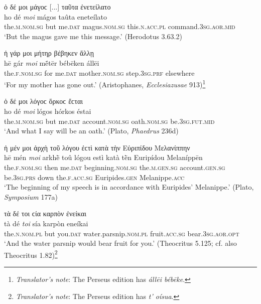 \begin{exe}
\ex ὁ δέ μοι μάγοϲ {[}...{]} ταῦτα ἐνετείλατο\\
\gll ho dé \emph{moi} mágos taûta eneteílato\\
the.\textsc{m.nom.sg} but me.\textsc{dat} magus.\textsc{nom.sg}
this.\textsc{n.acc.pl} command.\textsc{3sg.aor.mid}\\
\trans `But the magus gave me this message.' (Herodotus 3.63.2)
\label{artpron7}
\end{exe}

\begin{exe}
\ex ἡ γάρ μοι μήτηρ βέβηκεν ἄλλῃ\\
\gll hē gár \emph{moi} mḗtēr bébēken állēi\\
the.\textsc{f.nom.sg} for me.\textsc{dat} mother.\textsc{nom.sg}
step.\textsc{3sg.prf} elsewhere\\
\trans `For my mother has gone out.' (Aristophanes, \textit{Ecclesiazusae} 913)\footnote{\emph{Translator's note}: The Perseus edition has \textit{állēi bébēke}.}
\label{Eccles913}
\end{exe}

\begin{exe}
\ex ὁ δέ μοι λόγοϲ ὅρκοϲ ἔϲται\\
\gll ho dé \emph{moi} lógos hórkos éstai\\
the.\textsc{m.nom.sg} but me.\textsc{dat} account.\textsc{nom.sg}
oath.\textsc{nom.sg} be.\textsc{3sg.fut.mid}\\
\trans `And what I say will be an oath.' (Plato, \textit{Phaedrus} 236d)
\label{artpron9}
\end{exe}

\begin{exe}
\ex ἡ μέν μοι ἀρχὴ τοῦ λόγου ἐϲτὶ κατὰ τὴν Εὐριπίδου Μελανίππην\\
\gll hē mén \emph{moi} arkhḕ toû lógou estì katà tḕn Euripídou Melaníppēn\\ 
the.\textsc{f.nom.sg} then me.\textsc{dat} beginning.\textsc{nom.sg}
the.\textsc{m.gen.sg} account.\textsc{gen.sg} be.\textsc{3sg.prs} down the.\textsc{f.acc.sg} Euripides.\textsc{gen} Melanippe\textsc{.acc}\\
\trans `The beginning of my speech is in accordance with Euripides' Melanippe.' (Plato, \textit{Symposium} 177a)
\label{artpron10}
\end{exe}

\begin{exe}
\ex τὰ δέ τοι ϲία καρπὸν ἐνείκαι\\
\gll tà dé \emph{toi} sía karpòn eneíkai\\
the.\textsc{n.nom.pl} but you.\textsc{dat} water.parsnip.\textsc{nom.pl} fruit.\textsc{acc.sg} bear.\textsc{3sg.aor.opt}\\
\trans `And the water parsnip would bear fruit for you.' (Theocritus 5.125; cf. also Theocritus 1.82)\footnote{\emph{Translator's note}: The Perseus edition has \textit{t' oísua}.}
\label{artpron11}
\end{exe}

